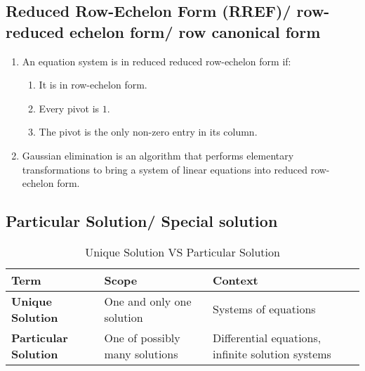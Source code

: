 \subsection{Reduced Row-Echelon Form (RREF)/ row-reduced echelon form/ row canonical form \cite{mfml/book/mml/Deisenroth-Faisal-Ong}}

\begin{enumerate}
    \item An equation system is in reduced reduced row-echelon form if:
    \begin{enumerate}
        \item It is in row-echelon form.
        \hfill \cite{mfml/book/mml/Deisenroth-Faisal-Ong}
    
        \item Every pivot is $1$.
        \hfill \cite{mfml/book/mml/Deisenroth-Faisal-Ong}
    
        \item The pivot is the only non-zero entry in its column.
        \hfill \cite{mfml/book/mml/Deisenroth-Faisal-Ong}
    \end{enumerate}

    \item Gaussian elimination is an algorithm that performs elementary transformations to bring a system of linear equations into reduced row-echelon form.
    \hfill \cite{mfml/book/mml/Deisenroth-Faisal-Ong}
\end{enumerate}



\subsection{Particular Solution/ Special solution}

\begin{customArrayStretch}{1.3}
\begin{table}[H]
    \centering
    \begin{tabular}{|l|l|l|}
        \hline
        \textbf{Term} & 
            \textbf{Scope} & 
            \textbf{Context} \\ \hline \hline
        
        \textbf{Unique Solution} & 
            One and only one solution & 
            Systems of equations \\ \hline

        \textbf{Particular Solution} & 
            One of possibly many solutions & 
            Differential equations, infinite solution systems \\ \hline

    \end{tabular}
    \caption*{Unique Solution VS Particular Solution \cite{common/online/chatgpt}}
\end{table}
\end{customArrayStretch}


